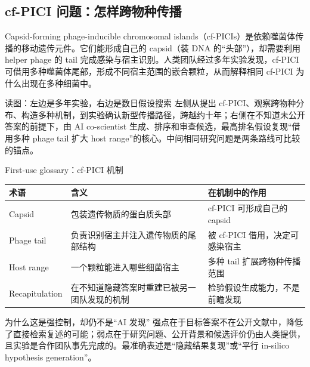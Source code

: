 
\subsection{cf-PICI 问题：怎样跨物种传播}

Capsid-forming phage-inducible chromosomal islands（cf-PICIs）是依赖噬菌体传播的移动遗传元件。它们能形成自己的 capsid（装 DNA 的“头部”），却需要利用 helper phage 的 tail 完成感染与宿主识别。人类团队经过多年实验发现，cf-PICI 可借用多种噬菌体尾部，形成不同宿主范围的嵌合颗粒，从而解释相同 cf-PICI 为什么出现在多种细菌中。


\begin{knowledgebox}{读图：左边是多年实验，右边是数日假设搜索}
左侧从提出 cf-PICI、观察跨物种分布、构造多种机制，到实验确认新型传播路径，跨越约十年；右侧在不知道未公开答案的前提下，由 AI co-scientist 生成、排序和审查候选，最高排名假设复现“借用多种 phage tail 扩大 host range”的核心。中间相同研究问题是两条路线可比较的锚点。
\end{knowledgebox}

\begin{knowledgebox}{First-use glossary：cf-PICI 机制}
\begin{tabularx}{\textwidth}{L{0.22\textwidth}X X}
\toprule
术语 & 含义 & 在机制中的作用 \\
\midrule
Capsid & 包装遗传物质的蛋白质头部 & cf-PICI 可形成自己的 capsid \\
Phage tail & 负责识别宿主并注入遗传物质的尾部结构 & 被 cf-PICI 借用，决定可感染宿主 \\
Host range & 一个颗粒能进入哪些细菌宿主 & 多种 tail 扩展跨物种传播范围 \\
Recapitulation & 在不知道隐藏答案时重建已被另一团队发现的机制 & 检验假设生成能力，不是前瞻发现 \\
\bottomrule
\end{tabularx}
\end{knowledgebox}


\begin{warningbox}{为什么这是强控制，却仍不是“AI 发现”}
强点在于目标答案不在公开文献中，降低了直接检索复述的可能；弱点在于研究问题、公开背景和候选评价仍由人类提供，且实验是合作团队事先完成的。最准确表述是“隐藏结果复现”或“平行 in-silico hypothesis generation”。
\end{warningbox}

